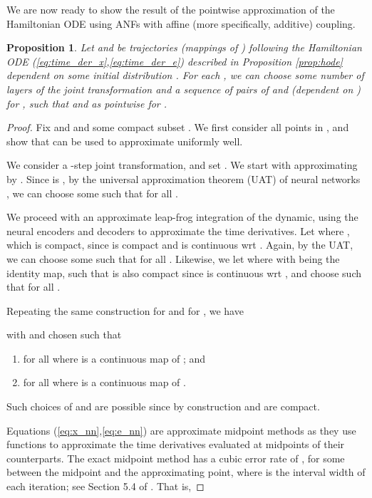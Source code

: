 \documentclass{article}
\newtheorem{proposition}{Proposition}
\begin{document}
We are now ready to show the result of the pointwise approximation of the Hamiltonian ODE using ANFs with affine (more specifically, additive) coupling. 
\begin{proposition}
\label{prop:anf_pointwise}
Let  and  be trajectories (mappings of ) following the Hamiltonian ODE (\ref{eq:time_der_x},\ref{eq:time_der_e}) described in Proposition \ref{prop:hode} dependent on some initial distribution . 
For each , we can choose some number of layers  of the joint transformation and a sequence of pairs of  and  (dependent on ) for , such that  and  as  pointwise for . 
\end{proposition}
\begin{proof}
Fix  and  and some compact subset .
We first consider all points  in , and show that  can be used to approximate  uniformly well. 

We consider a -step joint transformation, and set . 
We start with approximating  by .
Since  is , by the universal approximation theorem (UAT) of neural networks \citep{cybenko1989approximation}, we can choose some  such that  for all .

We proceed with an approximate leap-frog integration of the dynamic, using the neural encoders and decoders to approximate the time derivatives. 
Let  where , which is compact, since  is compact and  is continuous wrt .
Again, by the UAT, we can choose some  such that  for all . 
Likewise, we let  where  with  being the identity map, such that  is also compact since  is continuous wrt , and choose  such that  for all .

Repeating the same construction for  and  for , 
we have

with  and  chosen such that 
\begin{enumerate}
    \item  for all  where  is a continuous map of ; and
    \item  for all  where  is a continuous map of .
\end{enumerate}
Such choices of  and  are possible since by construction  and  are compact. 

Equations (\ref{eq:x_nn},\ref{eq:e_nn}) are approximate midpoint methods as they use functions to approximate the time derivatives evaluated at midpoints of their counterparts. 
The exact midpoint method has a cubic error rate of , for some  between the midpoint and the approximating point, where  is the interval width of each iteration; see Section 5.4 of \citet{epperson2013introduction}. 
That is,


\end{proof}
\end{document}
